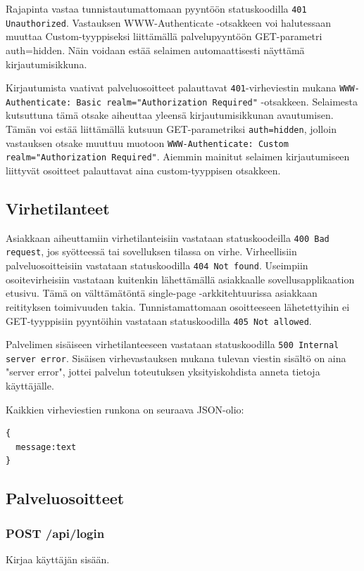 \documentclass[a4paper,parskip=half]{scrartcl}
\begin{document}
Rajapinta vastaa tunnistautumattomaan pyyntöön statuskoodilla \texttt{401
Unauthorized}.  Vastauksen WWW-Authenticate -otsakkeen voi halutessaan muuttaa
Custom-tyyppiseksi liittämällä palvelupyyntöön GET-parametri auth=hidden.  Näin
voidaan estää selaimen automaattisesti näyttämä kirjautumisikkuna.

Kirjautumista vaativat palveluosoitteet palauttavat \texttt{401}-virheviestin
mukana \texttt{WWW-Authenticate: Basic realm="Authorization Required"}
-otsakkeen. Selaimesta kutsuttuna tämä otsake aiheuttaa yleensä
kirjautumisikkunan avautumisen. Tämän voi estää liittämällä kutsuun
GET-parametriksi \texttt{auth=hidden}, jolloin vastauksen otsake muuttuu
muotoon \texttt{WWW-Authenticate: Custom realm="Authorization Required"}.
Aiemmin mainitut selaimen kirjautumiseen liittyvät osoitteet palauttavat aina
custom-tyyppisen otsakkeen.

\subsection{Virhetilanteet}

Asiakkaan aiheuttamiin virhetilanteisiin vastataan statuskoodeilla \texttt{400
Bad request}, jos syötteessä tai sovelluksen tilassa on virhe. Virheellisiin
palveluosoitteisiin vastataan statuskoodilla \texttt{404 Not found}. Useimpiin
osoitevirheisiin vastataan kuitenkin lähettämällä asiakkaalle
sovellusapplikaation etusivu. Tämä on välttämätöntä single-page
-arkkitehtuurissa asiakkaan reitityksen toimivuuden takia. Tunnistamattomaan
osoitteeseen lähetettyihin ei GET-tyyppisiin pyyntöihin vastataan
statuskoodilla \texttt{405 Not allowed}.

Palvelimen sisäiseen virhetilanteeseen vastataan statuskoodilla \texttt{500
Internal server error}. Sisäisen virhevastauksen mukana tulevan viestin sisältö
on aina "server error", jottei palvelun toteutuksen yksityiskohdista anneta
tietoja käyttäjälle.

Kaikkien virheviestien runkona on seuraava JSON-olio:
\begin{Verbatim}
{
  message:text
}
\end{Verbatim}

\subsection{Palveluosoitteet}

\subsubsection{POST /api/login}
Kirjaa käyttäjän sisään.
\end{document}
